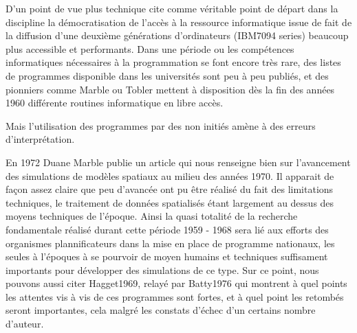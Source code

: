 
D'un point de vue plus technique \autocite{Haggett1969} cite comme véritable point de départ dans la discipline la  démocratisation de l'accès à la ressource informatique issue de fait de la diffusion d'une deuxième générations d'ordinateurs (IBM7094 series) beaucoup plus accessible et performants. Dans une période ou les compétences informatiques nécessaires à la programmation se font encore très rare, des listes de programmes disponible dans les universités sont peu à peu publiés, et des pionniers comme Marble ou Tobler mettent à disposition dès la fin des années 1960 différente routines informatique en libre accès.


Mais l'utilisation des programmes par des non initiés amène à des erreurs d'interprétation. 

En 1972 Duane Marble \autocite{Marble1972} publie un article qui nous renseigne bien sur l'avancement des simulations de modèles spatiaux au milieu des années 1970. Il apparait de façon assez claire que peu d'avancée ont pu être réalisé du fait des limitations techniques, le traitement de données spatialisés étant largement au dessus des moyens techniques de l'époque. Ainsi la quasi totalité de la recherche fondamentale réalisé durant cette période 1959 - 1968 sera lié aux efforts des organismes plannificateurs dans la mise en place de programme nationaux, les seules à l'époques à se pourvoir de moyen humains et techniques suffisament importants pour développer des simulations de ce type. Sur ce point, nous pouvons aussi citer Hagget1969, relayé par Batty1976 qui montrent à quel points les attentes vis à vis de ces programmes sont fortes\autocite{Haggett1969}, et à quel point les retombés seront importantes, cela malgré les constats d'échec d'un certains nombre d'auteur. 

